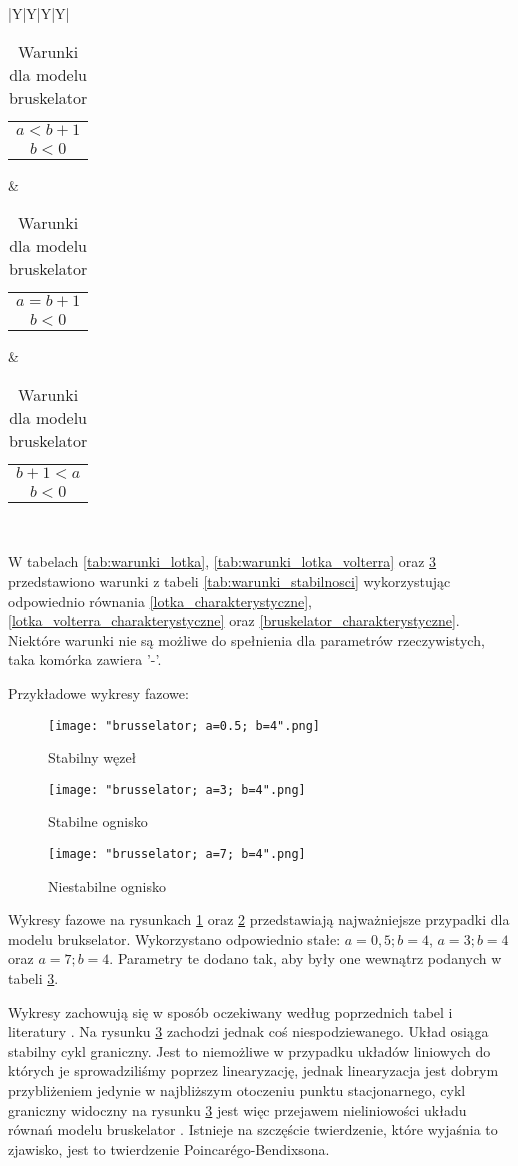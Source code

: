 \documentclass[10pt, a4paper, twoside, onecolumn]{article}
\numberwithin{equation}{section}
\begin{document}
\begin{table}[H]
\begin{tabularx}{\textwidth}{|Y|Y|Y|Y|}
{\begin{tabularx}{\columnwidth}{c}
				\(a<b+1\) \\
				\(b<0\)
			\end{tabularx}}
			& 
			{\begin{tabularx}{\columnwidth}{c} %
				\(a=b+1\) \\
				\(b<0\)
			\end{tabularx}}
			&
			{\begin{tabularx}{\columnwidth}{c} %
				\(b+1<a\) \\
				\(b<0\)
			\end{tabularx}}
			\\ 
		\end{tabularx}
		\caption{Warunki dla modelu bruskelator}
		\label{tab:warunki_bruskelator}
	\end{table}
	W tabelach \ref{tab:warunki_lotka}, \ref{tab:warunki_lotka_volterra} oraz \ref{tab:warunki_bruskelator} przedstawiono warunki z tabeli \ref{tab:warunki_stabilnosci} wykorzystując odpowiednio równania \eqref{lotka_charakterystyczne}, \eqref{lotka_volterra_charakterystyczne} oraz \eqref{bruskelator_charakterystyczne}. Niektóre warunki nie są możliwe do spełnienia dla parametrów rzeczywistych, taka komórka zawiera '-'. \par
	Przykładowe wykresy fazowe:
	\begin{figure}[H]
		\centering
		\texttt{[image: "brusselator; a=0.5; b=4".png]}
		\caption{Stabilny węzeł}
		\label{fig:stabilny_wezel}
	\end{figure}
	\begin{figure}[H]
		\centering
		\texttt{[image: "brusselator; a=3; b=4".png]}
		\caption{Stabilne ognisko}
		\label{fig:stabilne_ognisko}
	\end{figure}
	\begin{figure}[H]
		\centering
		\texttt{[image: "brusselator; a=7; b=4".png]}
		\caption{Niestabilne ognisko}
		\label{fig:niestabilne_ognisko}
	\end{figure}
	Wykresy fazowe na rysunkach \ref{fig:stabilny_wezel} oraz \ref{fig:stabilne_ognisko} przedstawiają najważniejsze przypadki dla modelu brukselator. Wykorzystano odpowiednio stałe: \(a=0,5; b=4\), \(a=3; b=4\) oraz \(a=7; b=4\). Parametry te dodano tak, aby były one wewnątrz podanych w tabeli \ref{tab:warunki_bruskelator}. \par
	Wykresy zachowują się w sposób oczekiwany według poprzednich tabel i literatury \cite{orlik}. Na rysunku \ref{fig:niestabilne_ognisko} zachodzi jednak coś niespodziewanego. Układ osiąga stabilny cykl graniczny. Jest to niemożliwe w przypadku układów liniowych do których je sprowadziliśmy poprzez linearyzację, jednak linearyzacja jest dobrym przybliżeniem jedynie w najbliższym otoczeniu punktu stacjonarnego, cykl graniczny widoczny na rysunku \ref{fig:niestabilne_ognisko} jest więc przejawem nieliniowości układu równań modelu bruskelator \cite{orlik}. Istnieje na szczęście twierdzenie, które wyjaśnia to zjawisko, jest to twierdzenie Poincar\'{e}go-Bendixsona. \par
\end{document}
